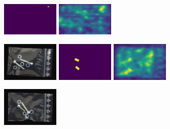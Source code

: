 \begin{figure}[H]
\begin{subfigure}[b]{\textwidth}
\begin{minipage}{0.45\textwidth}
            \includegraphics[width=0.3\textwidth]{figures/appendix/appendix_RevDist/PP/008_mask.png}
            \includegraphics[width=0.3\textwidth]{figures/appendix/appendix_RevDist/PP/008_m.png}
        \end{minipage}
    \end{subfigure}
    \hfill
    \begin{subfigure}[b]{\textwidth}
        \centering
        \begin{minipage}{0.45\textwidth}
            \centering
            \includegraphics[width=0.3\textwidth]{figures/appendix/appendix_RevDist/SB/002.png}
            \includegraphics[width=0.3\textwidth]{figures/appendix/appendix_RevDist/SB/002_mask.png}
            \includegraphics[width=0.3\textwidth]{figures/appendix/appendix_RevDist/SB/002m.png}
        \end{minipage}
        \begin{minipage}{0.45\textwidth}
            \centering
            \includegraphics[width=0.3\textwidth]{figures/appendix/appendix_RevDist/SB/008.png}

\end{minipage}
\end{subfigure}
\end{figure}
